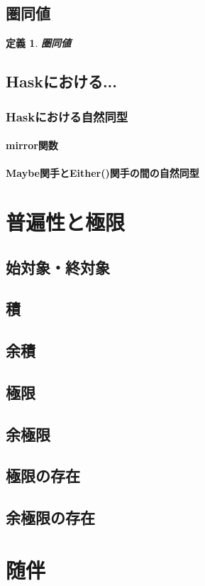 \documentclass{jsbook}
\theoremstyle{plain}
\newtheorem{Def}{定義}[chapter]
\begin{document}
\section{圏同値}
\begin{Def}
\bf{圏同値}
\end{Def}
\section{Haskにおける...}

\subsection{Haskにおける自然同型}
\subsubsection{mirror関数}
\subsubsection{Maybe関手とEither()関手の間の自然同型}
\chapter{普遍性と極限}
\section{始対象・終対象}
\section{積}
\section{余積}
\section{極限}
\section{余極限}
\section{極限の存在}
\section{余極限の存在}
\chapter{随伴}
\end{document}
